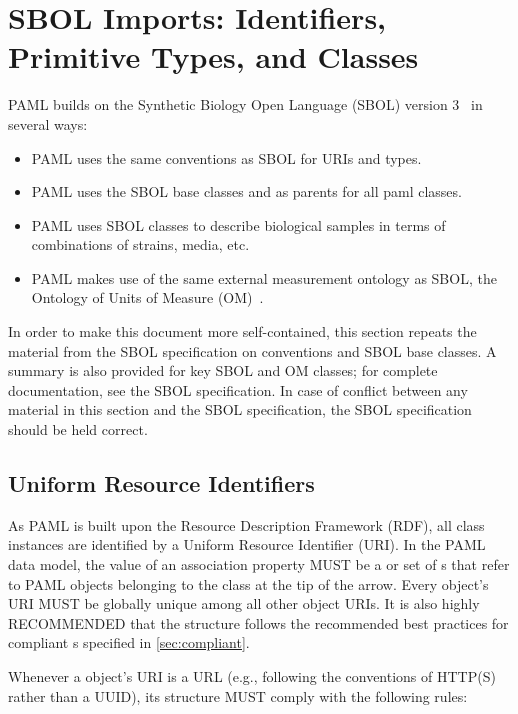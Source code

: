 \section{SBOL Imports: Identifiers, Primitive Types, and Classes}

PAML builds on the Synthetic Biology Open Language (SBOL) version 3~\citep{SBOL3} in several ways:
\begin{itemize}
\item PAML uses the same conventions as SBOL for URIs and types.
\item PAML uses the SBOL base classes  and  as parents for all paml classes.
\item PAML uses SBOL classes to describe biological samples in terms of combinations of strains, media, etc.
\item PAML makes use of the same external measurement ontology as SBOL, the Ontology of Units of Measure (OM)~\citep{om2}.
\end{itemize}

In order to make this document more self-contained, this section repeats the material from the SBOL specification on conventions and SBOL base classes.
A summary is also provided for key SBOL and OM classes; for complete documentation, see the SBOL specification.
In case of conflict between any material in this section and the SBOL specification, the SBOL specification should be held correct.

\subsection{Uniform Resource Identifiers}
\label{sec:URIstructure}

As PAML is built upon the Resource Description Framework (RDF), all class instances are identified by a Uniform Resource Identifier (URI).  In the PAML data model, the value of an association property MUST be a  or set of s that refer to PAML objects belonging to the class at the tip of the arrow.  Every  object's URI MUST be globally unique among all other  object URIs. It is also highly RECOMMENDED that the  structure follows the recommended best practices for compliant s specified in \ref{sec:compliant}.

Whenever a  object's URI is a URL (e.g., following the conventions of HTTP(S) rather than a UUID), its structure MUST comply with the following rules:

